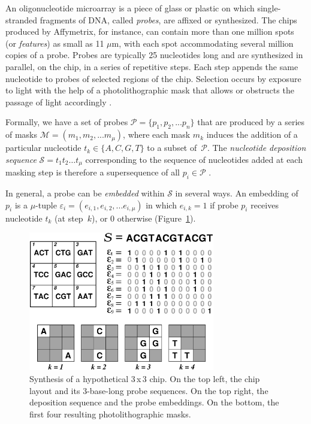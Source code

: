 \documentclass{llncs}
\begin{document}
An oligonucleotide microarray is a piece of glass or plastic on which
single-stranded fragments of DNA, called \emph{probes}, are affixed or
synthesized. The chips produced by Affymetrix, for instance, can contain
more than one million spots (or \emph{features}) as small as 11 $\mu$m,
with each spot accommodating several million copies of a probe. Probes
are typically 25 nucleotides long and are synthesized in parallel, on
the chip, in a series of repetitive steps. Each step appends the same
nucleotide to probes of selected regions of the chip. Selection occurs
by exposure to light with the help of a photolithographic mask that
allows or obstructs the passage of light accordingly \cite{FODOR91}.

Formally, we have a set of probes $\mathcal{P} = \{p_{1}, p_{2}, ... p_{n}\}$
that are produced by a series of masks $\mathcal{M} = (m_{1}, m_{2}, ... m_{\mu})$,
where each mask $m_{k}$ induces the addition of a particular nucleotide
$t_{k} \in \{A, C, G, T\}$ to a subset of~$\mathcal{P}$. The \emph{nucleotide
deposition sequence} $\mathcal{S} = t_{1} t_{2} \ldots t_{\mu}$ corresponding
to the sequence of nucleotides added at each masking step is therefore a
supersequence of all $p_{i} \in \mathcal{P}$ \cite{RAHMANN03}.

In general, a probe can be \emph{embedded} within $\mathcal{S}$ in several
ways. An embedding of $p_{i}$ is a $\mu$-tuple
$\varepsilon_{i} = (e_{i,1}, e_{i,2}, ... e_{i,\mu})$ in which $e_{i,k} = 1$
if probe $p_{i}$ receives nucleotide $t_{k}$ (at step~$k$), or 0 otherwise
(Figure~\ref{fig:masking_process}).

\begin{figure}
\centerline{\includegraphics[width=230pt]{chip}}
\caption{Synthesis of a hypothetical 3\,x\,3 chip. On the top left, the chip layout and its 3-base-long probe sequences. On the top right, the deposition sequence and the probe embeddings. On the bottom, the first four resulting photolithographic masks.}
\label{fig:masking_process}
\end{figure}
\end{document}
